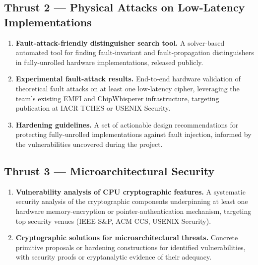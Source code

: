 \subsection*{Thrust 2 — Physical Attacks on Low-Latency Implementations}
\begin{enumerate}[label=\textbf{D\arabic*.}, leftmargin=*, itemsep=2pt, start=4]
  \item \textbf{Fault-attack-friendly distinguisher search tool.}
        A solver-based automated tool for finding fault-invariant and fault-propagation distinguishers in fully-unrolled hardware implementations, released publicly.

  \item \textbf{Experimental fault-attack results.}
        End-to-end hardware validation of theoretical fault attacks on at least one low-latency cipher, leveraging the team's existing EMFI and ChipWhisperer infrastructure, targeting publication at IACR TCHES or USENIX Security.

  \item \textbf{Hardening guidelines.}
        A set of actionable design recommendations for protecting fully-unrolled implementations against fault injection, informed by the vulnerabilities uncovered during the project.
\end{enumerate}

\subsection*{Thrust 3 — Microarchitectural Security}
\begin{enumerate}[label=\textbf{D\arabic*.}, leftmargin=*, itemsep=2pt, start=7]
  \item \textbf{Vulnerability analysis of CPU cryptographic features.}
        A systematic security analysis of the cryptographic components underpinning at least one hardware memory-encryption or pointer-authentication mechanism, targeting top security venues (IEEE S\&P, ACM CCS, USENIX Security).

  \item \textbf{Cryptographic solutions for microarchitectural threats.}
        Concrete primitive proposals or hardening constructions for identified vulnerabilities, with security proofs or cryptanalytic evidence of their adequacy.
\end{enumerate}

